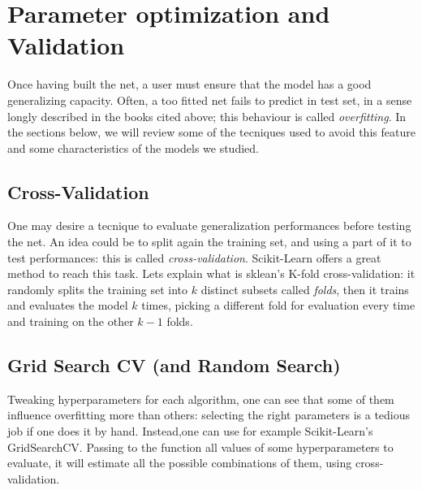 \documentclass{article}
\begin{document}


\section{Parameter optimization and Validation}

Once having built the net, a user must ensure that the model has a good generalizing capacity. Often, a too fitted net fails to predict in test set, in a sense longly described in the books cited above; this behaviour is called \textit{overfitting}.
In the sections below, we will review some of the tecniques used to avoid this feature and some characteristics of the models we studied.

\subsection{Cross-Validation}

One may desire a tecnique to evaluate generalization performances before testing the net. An idea could be to split again the training set, and using a part of it to test performances: this is called \textit{cross-validation}.
Scikit-Learn offers a great method to reach this task. Lets explain what is sklean's K-fold cross-validation: it randomly splits the training set into $k$ distinct subsets called \textit{folds}, then it trains and evaluates the model $k$ times, picking a different fold for evaluation every time and training on the other $k-1$ folds.


\subsection{Grid Search CV (and Random Search)}
Tweaking hyperparameters for each algorithm, one can see that some of them influence overfitting more than others: selecting the right parameters is a tedious job if one does it by hand.
Instead,one can use for example Scikit-Learn’s GridSearchCV. Passing to the function all values of some hyperparameters to evaluate, it will estimate all the possible combinations of them, using cross-validation. 
\end{document}
